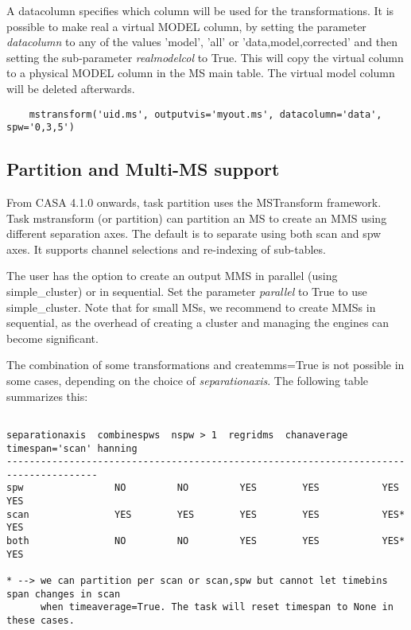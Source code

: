 A datacolumn specifies which column will be used for the transformations. It is
possible to make real a virtual MODEL column, by setting the parameter
{\it datacolumn} to any of the values 'model', 'all' or 'data,model,corrected'
and then setting the sub-parameter {\it realmodelcol} to True. This will copy the virtual
column to a physical MODEL column in the MS main table. The virtual model column
will be deleted afterwards.

\begin{verbatim}
    mstransform('uid.ms', outputvis='myout.ms', datacolumn='data', spw='0,3,5')
\end{verbatim}

\subsection{Partition and Multi-MS support}
From CASA 4.1.0 onwards, task partition uses the MSTransform framework.
Task mstransform (or partition) can partition an MS to create an MMS using
different separation axes. The default is to separate using both scan and spw axes.
It supports channel selections and re-indexing of sub-tables. 

The user has the option to create an output MMS in parallel (using simple_cluster) or
in sequential. Set the parameter {\it parallel} to True to use simple_cluster. Note that
for small MSs, we recommend to create MMSs in sequential, as the overhead of creating
a cluster and managing the engines can become significant.

The combination of some transformations and createmms=True is not possible in
some cases, depending on the choice of {\it separationaxis}. The following table summarizes this:

\begin{verbatim}

separationaxis  combinespws  nspw > 1  regridms  chanaverage  timespan='scan' hanning
--------------------------------------------------------------------------------------
spw                NO         NO         YES        YES           YES           YES
scan               YES        YES        YES        YES           YES*          YES
both               NO         NO         YES        YES           YES*          YES

* --> we can partition per scan or scan,spw but cannot let timebins span changes in scan
      when timeaverage=True. The task will reset timespan to None in these cases.

\end{verbatim}

